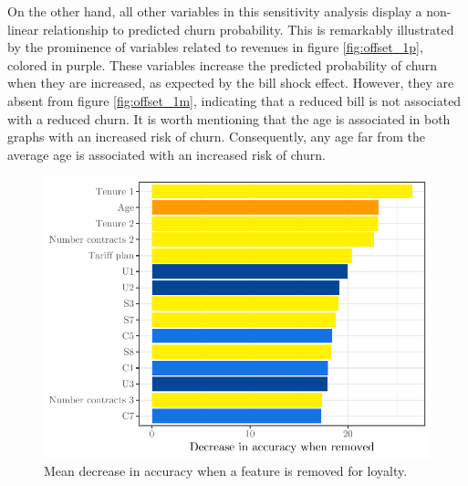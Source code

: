 On the other hand, all other variables in this sensitivity analysis display a
non-linear relationship to predicted churn probability. This is remarkably
illustrated by the prominence of variables related to revenues in figure
\ref{fig:offset_1p}, colored in purple. These variables increase the predicted
probability of churn when they are increased, as expected by the bill shock
effect. However, they are absent from figure \ref{fig:offset_1m}, indicating
that a reduced bill is not associated with a reduced churn. It is worth mentioning
that the age is associated in both graphs with an increased risk of churn.
Consequently, any age far from the average age is associated with an increased
risk of churn.


\begin{figure}
    \centering
    \includegraphics[width=0.9\linewidth]{figures/var_imp_loy_decrease_accuracy.pdf}
    \caption{Mean decrease in accuracy when a feature is removed for loyalty.}
    \label{fig:var_imp_loy_decrease_accuracy}
\end{figure}

